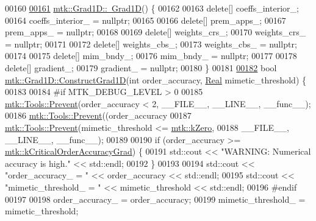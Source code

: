\begin{DoxyCode}
00160 
\hypertarget{mtk__grad__1d_8cc_source_l00161}{}\hyperlink{classmtk_1_1Grad1D_a2f9b1d306c0f09f36145bb1e7e486b54}{00161} \hyperlink{classmtk_1_1Grad1D_a2f9b1d306c0f09f36145bb1e7e486b54}{mtk::Grad1D::~Grad1D}() \{
00162 
00163   \textcolor{keyword}{delete}[] coeffs\_interior\_;
00164   coeffs\_interior\_ = \textcolor{keyword}{nullptr};
00165 
00166   \textcolor{keyword}{delete}[] prem\_apps\_;
00167   prem\_apps\_ = \textcolor{keyword}{nullptr};
00168 
00169   \textcolor{keyword}{delete}[] weights\_crs\_;
00170   weights\_crs\_ = \textcolor{keyword}{nullptr};
00171 
00172   \textcolor{keyword}{delete}[] weights\_cbs\_;
00173   weights\_cbs\_ = \textcolor{keyword}{nullptr};
00174 
00175   \textcolor{keyword}{delete}[] mim\_bndy\_;
00176   mim\_bndy\_ = \textcolor{keyword}{nullptr};
00177 
00178   \textcolor{keyword}{delete}[] gradient\_;
00179   gradient\_ = \textcolor{keyword}{nullptr};
00180 \}
00181 
\hypertarget{mtk__grad__1d_8cc_source_l00182}{}\hyperlink{classmtk_1_1Grad1D_a74ef5245cfae6fd158bd7f563a0c2e52}{00182} \textcolor{keywordtype}{bool} \hyperlink{classmtk_1_1Grad1D_a74ef5245cfae6fd158bd7f563a0c2e52}{mtk::Grad1D::ConstructGrad1D}(\textcolor{keywordtype}{int} order\_accuracy, 
      \hyperlink{group__c01-roots_gac080bbbf5cbb5502c9f00405f894857d}{Real} mimetic\_threshold) \{
00183 
00184 \textcolor{preprocessor}{  #if MTK\_DEBUG\_LEVEL > 0}
00185   \hyperlink{classmtk_1_1Tools_afe5bb096309258e2e72503fd7b41c7e0}{mtk::Tools::Prevent}(order\_accuracy < 2, \_\_FILE\_\_, \_\_LINE\_\_, \_\_func\_\_);
00186   \hyperlink{classmtk_1_1Tools_afe5bb096309258e2e72503fd7b41c7e0}{mtk::Tools::Prevent}((order\_accuracy%
00187   \hyperlink{classmtk_1_1Tools_afe5bb096309258e2e72503fd7b41c7e0}{mtk::Tools::Prevent}(mimetic\_threshold <= \hyperlink{group__c01-roots_ga59a451a5fae30d59649bcda274fea271}{mtk::kZero},
00188                       \_\_FILE\_\_, \_\_LINE\_\_, \_\_func\_\_);
00189 
00190   \textcolor{keywordflow}{if} (order\_accuracy >= \hyperlink{group__c01-roots_ga295dd2f403c775ecd942c22b5a777496}{mtk::kCriticalOrderAccuracyGrad}) \{
00191     std::cout << \textcolor{stringliteral}{"WARNING: Numerical accuracy is high."} << std::endl;
00192   \}
00193 
00194   std::cout << \textcolor{stringliteral}{"order\_accuracy\_ = "} << order\_accuracy << std::endl;
00195   std::cout << \textcolor{stringliteral}{"mimetic\_threshold\_ = "} << mimetic\_threshold << std::endl;
00196 \textcolor{preprocessor}{  #endif}
00197 
00198   order\_accuracy\_ = order\_accuracy;
00199   mimetic\_threshold\_ = mimetic\_threshold;

\end{DoxyCode}
